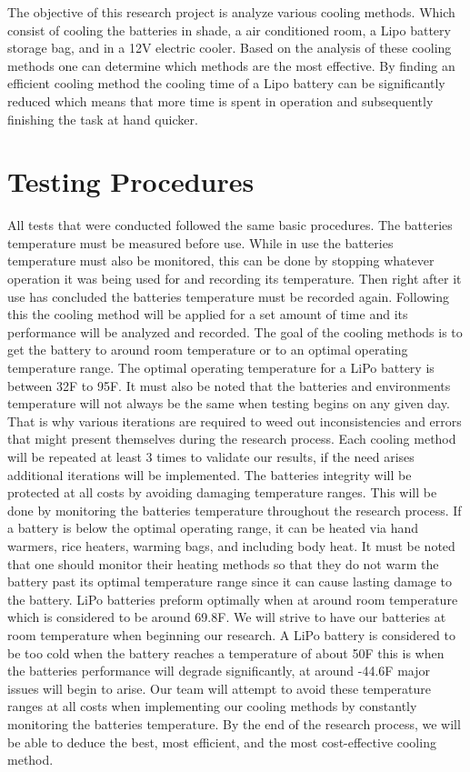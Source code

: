 \documentclass[12pt]{article}
\begin{document}
The objective of this research project is analyze various cooling methods. Which consist of cooling the batteries in shade, a air conditioned room, a Lipo battery storage bag, and in a 12V electric cooler. Based on the analysis of these cooling methods one can determine which methods are the most effective. By finding an efficient cooling method the cooling time of a Lipo battery can be significantly reduced which means that more time is spent in operation and subsequently finishing the task at hand quicker. 

\section{Testing Procedures}
All tests that were conducted followed the same basic procedures. The batteries temperature must be measured before use. While in use the batteries temperature must also be monitored, this can be done by stopping whatever operation it was being used for and recording its temperature. Then right after it use has concluded the batteries temperature must be recorded again. Following this the cooling method will be applied for a set amount of time and its performance will be analyzed and recorded. The goal of the cooling methods is to get the battery to around room temperature or to an optimal operating temperature range. The optimal operating temperature for a LiPo battery is between 32\degree F to 95\degree F. It must also be noted that the batteries and environments temperature will not always be the same when testing begins on any given day. That is why various iterations are required to weed out inconsistencies and errors that might present themselves during the research process. Each cooling method will be repeated at least 3 times to validate our results, if the need arises additional iterations will be implemented. The batteries integrity will be protected at all costs by avoiding damaging temperature ranges. This will be done by monitoring the batteries temperature throughout the research process. If a battery is below the optimal operating range, it can be heated via hand warmers, rice heaters, warming bags, and including body heat. It must be noted that one should monitor their heating methods so that they do not warm the battery past its optimal temperature range since it can cause lasting damage to the battery. LiPo batteries preform optimally when at around room temperature which is considered to be around 69.8\degree F. We will strive to have our batteries at room temperature when beginning our research. A LiPo battery is considered to be too cold when the battery reaches a temperature of about 50\degree F this is when the batteries performance will degrade significantly, at around -44.6\degree F major issues will begin to arise. Our team will attempt to avoid these temperature ranges at all costs when implementing our cooling methods by constantly monitoring the batteries temperature. By the end of the research process, we will be able to deduce the best, most efficient, and the most cost-effective cooling method.
\end{document}
